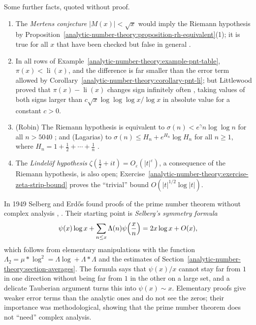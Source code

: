 \begin{remark}\label{analytic-number-theory:remark-rh-facts}
Some further facts, quoted without proof.
\begin{enumerate}
\item The \emph{Mertens conjecture} $|M(x)| < \sqrt{x}$ would imply the Riemann hypothesis by Proposition~\ref{analytic-number-theory:proposition-rh-equivalent}(1); it is true for all $x$ that have been checked but
false in general \cite{odlyzko-te-riele}.
\item In all rows of Example~\ref{analytic-number-theory:example-pnt-table}, $\pi(x) < \operatorname{li}(x)$, and the difference is far smaller than the error term allowed by
Corollary~\ref{analytic-number-theory:corollary-pnt-li}; but Littlewood proved that $\pi(x) - \operatorname{li}(x)$ changes sign infinitely often \cite{littlewood-1914}, taking values of both signs larger than $c\sqrt{x}\log\log\log x/\log x$ in absolute value for a constant $c > 0$.
\item (Robin) The Riemann hypothesis is equivalent to $\sigma(n) < e^\gamma n\log\log n$ for all $n > 5040$ \cite{robin-1984}; and (Lagarias) to $\sigma(n) \leq H_n + e^{H_n}\log H_n$ for all
$n \geq 1$, where $H_n = 1 + \frac12 + \cdots + \frac1n$ \cite{lagarias-2002}.
\item The \emph{Lindelöf hypothesis} $\zeta(\frac12 + it) = O_\varepsilon(|t|^\varepsilon)$, a consequence of the Riemann hypothesis, is also open; Exercise~\ref{analytic-number-theory:exercise-zeta-strip-bound}
proves the ``trivial'' bound $O(|t|^{1/2}\log|t|)$.
\end{enumerate}
\end{remark}

\begin{remark}\label{analytic-number-theory:remark-selberg}
In 1949 Selberg and Erd\H{o}s found proofs of the prime number theorem without complex analysis \cite{selberg-1949}, \cite{erdos-1949}. Their starting point is \emph{Selberg's symmetry formula}
\[
\psi(x)\log x + \sum_{n \leq x}\Lambda(n)\psi\Bigl(\frac xn\Bigr) = 2x\log x + O(x),
\]
which follows from elementary manipulations with the function $\Lambda_2 = \mu * \log^2 = \Lambda\log + \Lambda * \Lambda$ and the estimates of Section~\ref{analytic-number-theory:section-averages}. The formula
says that $\psi(x)/x$ cannot stay far from $1$ in one direction without being far from $1$ in the other on a large set, and a delicate Tauberian argument turns this into $\psi(x) \sim x$. Elementary
proofs give weaker error terms than the analytic ones and do not see the zeros; their importance was methodological, showing that the prime number theorem does not ``need'' complex analysis.
\end{remark}

